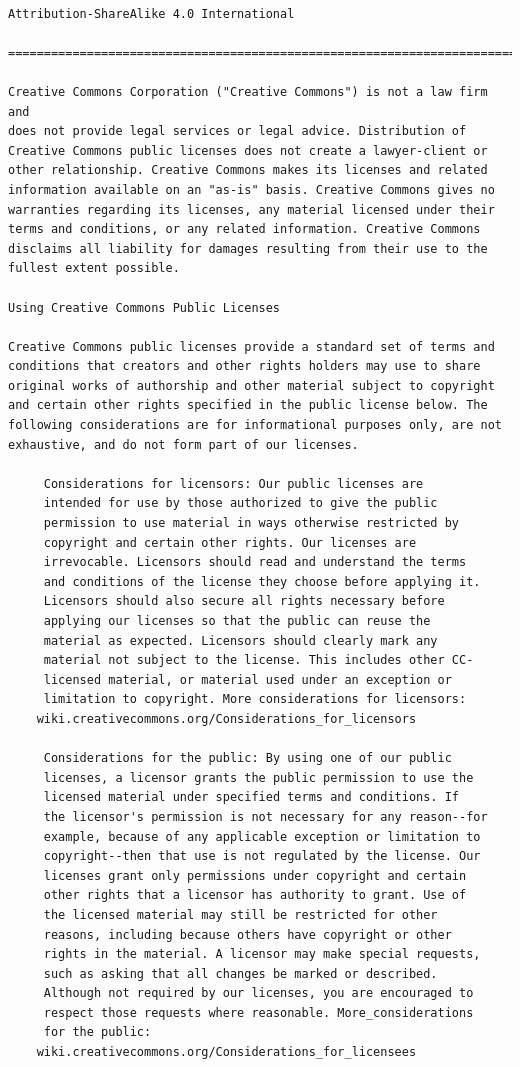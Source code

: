 \documentclass[12pt,spanish,]{scrartcl}
\begin{document}
\begin{verbatim}

Attribution-ShareAlike 4.0 International

=======================================================================

Creative Commons Corporation ("Creative Commons") is not a law firm and
does not provide legal services or legal advice. Distribution of
Creative Commons public licenses does not create a lawyer-client or
other relationship. Creative Commons makes its licenses and related
information available on an "as-is" basis. Creative Commons gives no
warranties regarding its licenses, any material licensed under their
terms and conditions, or any related information. Creative Commons
disclaims all liability for damages resulting from their use to the
fullest extent possible.

Using Creative Commons Public Licenses

Creative Commons public licenses provide a standard set of terms and
conditions that creators and other rights holders may use to share
original works of authorship and other material subject to copyright
and certain other rights specified in the public license below. The
following considerations are for informational purposes only, are not
exhaustive, and do not form part of our licenses.

     Considerations for licensors: Our public licenses are
     intended for use by those authorized to give the public
     permission to use material in ways otherwise restricted by
     copyright and certain other rights. Our licenses are
     irrevocable. Licensors should read and understand the terms
     and conditions of the license they choose before applying it.
     Licensors should also secure all rights necessary before
     applying our licenses so that the public can reuse the
     material as expected. Licensors should clearly mark any
     material not subject to the license. This includes other CC-
     licensed material, or material used under an exception or
     limitation to copyright. More considerations for licensors:
    wiki.creativecommons.org/Considerations_for_licensors

     Considerations for the public: By using one of our public
     licenses, a licensor grants the public permission to use the
     licensed material under specified terms and conditions. If
     the licensor's permission is not necessary for any reason--for
     example, because of any applicable exception or limitation to
     copyright--then that use is not regulated by the license. Our
     licenses grant only permissions under copyright and certain
     other rights that a licensor has authority to grant. Use of
     the licensed material may still be restricted for other
     reasons, including because others have copyright or other
     rights in the material. A licensor may make special requests,
     such as asking that all changes be marked or described.
     Although not required by our licenses, you are encouraged to
     respect those requests where reasonable. More_considerations
     for the public:
    wiki.creativecommons.org/Considerations_for_licensees


\end{verbatim}
\end{document}
